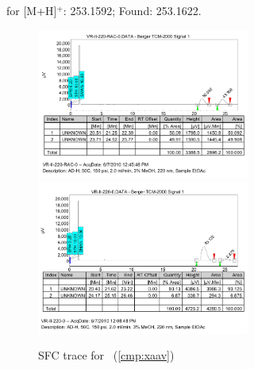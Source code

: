 for  [M+H]$^+$: 253.1592; Found: 253.1622.  \\
\begin{figure}[h]
\centering
\includegraphics[width=2.75in]{chp_asymmetric/images/sfc/xaav-rac.png}
\includegraphics[width=2.75in]{chp_asymmetric/images/sfc/xaav.png}
\caption{SFC trace for \CMPxaav~(\ref{cmp:xaav})}
\vspace{-10pt}
\end{figure}

